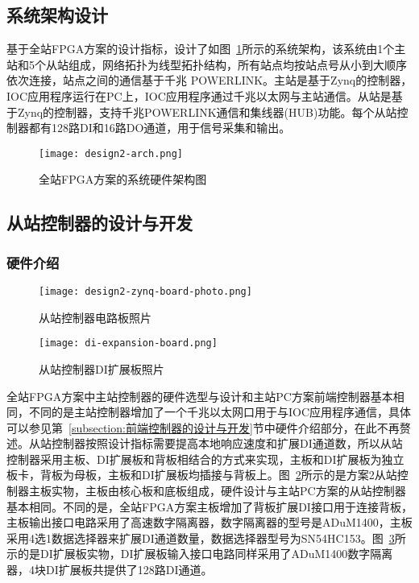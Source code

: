 \subsection{系统架构设计}
\label{subsection:全站FPGA方案系统架构设计}
基于全站FPGA方案的设计指标，设计了如图~\ref{fig:design2-arch}所示的系统架构，该系统由1个主站和5个从站组成，网络拓扑为线型拓扑结构，所有站点均按站点号从小到大顺序依次连接，站点之间的通信基于千兆 POWERLINK。主站是基于Zynq的控制器，IOC应用程序运行在PC上，IOC应用程序通过千兆以太网与主站通信。从站是基于Zynq的控制器，支持千兆POWERLINK通信和集线器(HUB)功能。每个从站控制器都有128路DI和16路DO通道，用于信号采集和输出。

\begin{figure}[htbp]
  \centering
  \texttt{[image: design2-arch.png]}
  \caption{全站FPGA方案的系统硬件架构图}
  \label{fig:design2-arch}
\end{figure}

\subsection{从站控制器的设计与开发}

\subsubsection{硬件介绍}

\begin{figure}[htbp]
  \centering
  \texttt{[image: design2-zynq-board-photo.png]}
  \caption{从站控制器电路板照片}
  \label{fig:design2-zynq-board-photo}
\end{figure}

\begin{figure}[htbp]
  \centering
  \texttt{[image: di-expansion-board.png]}
  \caption{从站控制器DI扩展板照片}
  \label{fig:di-expansion-board}
\end{figure}

全站FPGA方案中主站控制器的硬件选型与设计和主站PC方案前端控制器基本相同，不同的是主站控制器增加了一个千兆以太网口用于与IOC应用程序通信，具体可以参见第~\ref{subsection:前端控制器的设计与开发}节中硬件介绍部分，在此不再赘述。从站控制器按照设计指标需要提高本地响应速度和扩展DI通道数，所以从站控制器采用主板、DI扩展板和背板相结合的方式来实现，主板和DI扩展板为独立板卡，背板为母板，主板和DI扩展板均插接与背板上。图~\ref{fig:design2-zynq-board-photo}所示的是方案2从站控制器主板实物，主板由核心板和底板组成，硬件设计与主站PC方案的从站控制器基本相同。不同的是，全站FPGA方案主板增加了背板扩展DI接口用于连接背板，主板输出接口电路采用了高速数字隔离器，数字隔离器的型号是ADuM1400，主板采用4选1数据选择器来扩展DI通道数量，数据选择器型号为SN54HC153。图~\ref{fig:di-expansion-board}所示的是DI扩展板实物，DI扩展板输入接口电路同样采用了ADuM1400数字隔离器，4块DI扩展板共提供了128路DI通道。


